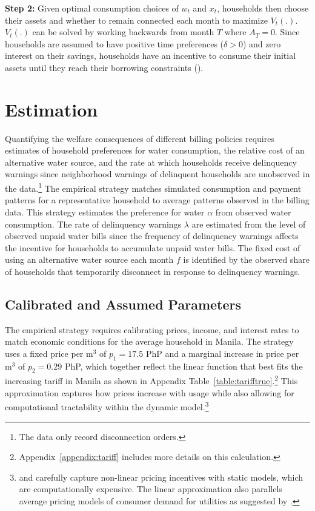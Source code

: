 \documentclass[12pt]{article}
\begin{document}
\textbf{Step 2:}  Given optimal consumption choices of $w_t$ and $x_t$, households then choose their assets and whether to remain connected each month to maximize $V_t(.)$.  $V_t(.)$ can be solved by working backwards from month $T$ where $A_T = 0$.  Since households are assumed to have positive time preferences ($\delta>0$) and zero interest on their savings, households have an incentive to consume their initial assets until they reach their borrowing constraints (\cite{deaton1991saving}).  

\section{Estimation}\label{section:estimation}

Quantifying the welfare consequences of different billing policies requires estimates of household preferences for water consumption, the relative cost of an alternative water source, and the rate at which households receive delinquency warnings since neighborhood warnings of delinquent households are unobserved in the data.\footnote{The data only record disconnection orders.}  The empirical strategy matches simulated consumption and payment patterns for a representative household to average patterns observed in the billing data.  This strategy estimates the preference for water $\alpha$ from observed water consumption.  The rate of delinquency warnings $\lambda$ are estimated from the level of observed unpaid water bills since the frequency of delinquency warnings affects the incentive for households to accumulate unpaid water bills.  The fixed cost of using an alternative water source each month $f$ is identified by the observed share of households that temporarily disconnect in response to delinquency warnings.  

\subsection{Calibrated and Assumed Parameters}

The empirical strategy requires calibrating prices, income, and interest rates to match economic conditions for the average household in Manila.  The strategy uses a fixed price per $\text{m}^{3}$ of $p_1=17.5$ PhP and a marginal increase in price per $\text{m}^{3}$ of $p_2=0.29$ PhP, which together reflect the linear function that best fits the increasing tariff in Manila as shown in Appendix Table~\ref{table:tarifftrue}.\footnote{Appendix~\ref{appendix:tariff} includes more details on this calculation. }  This approximation captures how prices increase with usage while also allowing for computational tractability within the dynamic model.\footnote{\cite{wjv} and \cite{szabo2015value} carefully capture non-linear pricing incentives with static models, which are computationally expensive.  The linear approximation also parallels average pricing models of consumer demand for utilities as suggested by \cite{ito2014consumers}.}  
\end{document}
